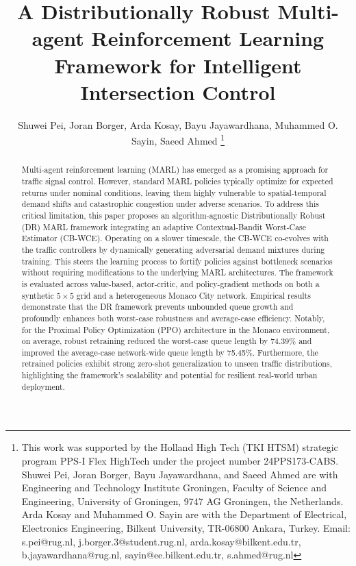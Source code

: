 \documentclass[lettersize,journal]{IEEEtran}
\begin{document}
\title{A Distributionally Robust Multi-agent Reinforcement Learning Framework for Intelligent Intersection Control}
\author{Shuwei Pei, Joran Borger, Arda Kosay, Bayu Jayawardhana, Muhammed O. Sayin, Saeed Ahmed
\thanks{This work was supported by the Holland High Tech (TKI HTSM) strategic program PPS-I Flex HighTech under the project number 24PPS173-CABS.\\ Shuwei Pei, Joran Borger, Bayu Jayawardhana, and Saeed Ahmed are with Engineering and Technology Institute Groningen, Faculty of Science and Engineering, University of Groningen, 9747 AG Groningen, the Netherlands. Arda Kosay and Muhammed O. Sayin are with the Department of Electrical, Electronics Engineering, Bilkent University, TR-06800 Ankara, Turkey. Email: s.pei@rug.nl, j.borger.3@student.rug.nl, arda.kosay@bilkent.edu.tr, b.jayawardhana@rug.nl, sayin@ee.bilkent.edu.tr, s.ahmed@rug.nl}}

\maketitle


\begin{abstract}
Multi-agent reinforcement learning (MARL) has emerged as a promising approach for traffic signal control. However, standard MARL policies typically optimize for expected returns under nominal conditions, leaving them highly vulnerable to spatial-temporal demand shifts and catastrophic congestion under adverse scenarios. To address this critical limitation, this paper proposes an algorithm-agnostic Distributionally Robust (DR) MARL framework integrating an adaptive Contextual-Bandit Worst-Case Estimator (CB-WCE). Operating on a slower timescale, the CB-WCE co-evolves with the traffic controllers by dynamically generating adversarial demand mixtures during training. This steers the learning process to fortify policies against bottleneck scenarios without requiring modifications to the underlying MARL architectures. The framework is evaluated across value-based, actor-critic, and policy-gradient methods on both a synthetic $5\times 5$ grid and a heterogeneous Monaco City network. Empirical results demonstrate that the DR framework prevents unbounded queue growth and profoundly enhances both worst-case robustness and average-case efficiency. Notably, for the Proximal Policy Optimization (PPO) architecture in the Monaco environment, on average, robust retraining reduced the worst-case queue length by 74.39\% and improved the average-case network-wide queue length by 75.45\%. Furthermore, the retrained policies exhibit strong zero-shot generalization to unseen traffic distributions, highlighting the framework's scalability and potential for resilient real-world urban deployment.
\end{abstract}
\end{document}
